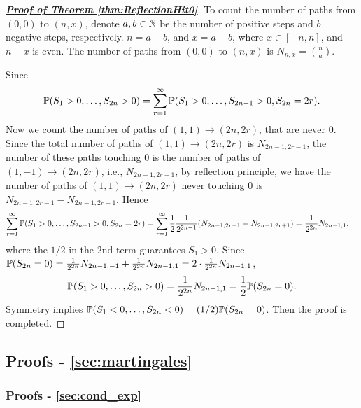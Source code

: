 \documentclass[10pt,a4paper]{article}
\begin{document}
\begin{proof}[\underline{\textbf{Proof of Theorem \ref{thm:ReflectionHit0}}}]
	To count the number of paths from $(0,0)$ to $(n,x)$, denote $a,b\in\mathbb N$ be the number of positive steps and $b$ negative steps, respectively. $n=a+b$, and $x=a-b$, where $x\in[-n,n]$, and $n-x$ is even. The number of paths from $(0,0)$ to $(n,x)$ is $N_{n,x}=\binom{n}{a}$. 
	
	Since 
	\begin{equation*}
		\mathbb P(S_{1}>0,\ldots,S_{2n}>0)=\sum_{r=1}^{\infty}\mathbb P(S_{1}>0,\ldots,S_{2n-1}>0,S_{2n}=2r).	
	\end{equation*}  
	Now we count the number of paths of $(1,1)\rightarrow(2n,2r)$, that are never 0. Since the total number of paths of $(1,1)\rightarrow(2n,2r)$ is $N_{2n-1,2r-1}$, the number of these paths touching 0 is the number of paths of $(1,-1)\rightarrow(2n,2r)$, i.e., $N_{2n-1,2r+1}$, by reflection principle, we have the number of paths of $(1,1)\rightarrow(2n,2r)$ never touching 0 is $N_{2n-1,2r-1}-N_{2n-1,2r+1}$. Hence 
	\begin{align*}
		\sum_{r=1}^{\infty}\mathbb P(S_{1}>0,\ldots,S_{2n-1}>0,S_{2n}=2r)&=\sum_{r=1}^{\infty}\frac{1}{2}\frac{1}{2^{2n-1}}(N_{2n-1,2r-1}-N_{2n-1,2r+1})=\frac{1}{2^{2n}}N_{2n-1,1},
	\end{align*}        
	where the $1/2$ in the $2$nd term guarantees $S_1>0$. Since $\mathbb P(S_{2n}=0)=\frac{1}{2^{2n}}N_{2n-1,-1}+\frac{1}{2^{2n}}N_{2n-1,1}=2\cdot \frac{1}{2^{2n}}N_{2n-1,1}$,      
	\begin{equation*}
		\mathbb P(S_{1}>0,\ldots,S_{2n}>0)=\frac{1}{2^{2n}}N_{2n-1,1}=\frac{1}{2}\mathbb P(S_{2n}=0).
	\end{equation*}
	Symmetry implies $\mathbb P(S_{1}<0,\ldots,S_{2n}<0)=(1/2)\mathbb P(S_{2n}=0)$. Then the proof is completed.
\end{proof}

\subsection{Proofs - \ref{sec:martingales}}\label{sec:proof-martingales}

\subsubsection{Proofs - \ref{sec:cond_exp}}\label{sec:proof-cond_exp}




\end{document}
